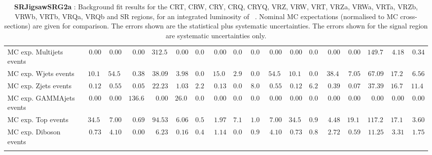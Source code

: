 \begin{table}
{\begin{tabular*}{\textwidth}{@{\extracolsep{\fill}}lrrrrrrrrrrrrrrrrr}
\noalign{\smallskip}\hline\noalign{\smallskip}
        MC exp. Multijets events         & $0.00$          & $0.00$          & $0.00$          & $312.57$          & $0.00$          & $0.00$          & $0.00$          & $0.00$          & $0.00$          & $0.00$          & $0.00$          & $0.00$          & $0.00$          & $0.00$          & $149.73$          & $4.18$          & $0.34$              \\
        MC exp. Wjets events         & $10.18$          & $54.56$          & $0.38$          & $38.09$          & $3.98$          & $0.00$          & $15.00$          & $2.95$          & $0.00$          & $54.56$          & $10.18$          & $0.00$          & $38.40$          & $7.05$          & $67.09$          & $17.29$          & $6.56$              \\
        MC exp. Zjets events         & $0.12$          & $0.55$          & $0.05$          & $22.23$          & $1.03$          & $2.29$          & $0.13$          & $0.02$          & $8.08$          & $0.55$          & $0.12$          & $6.29$          & $0.39$          & $0.07$          & $37.39$          & $16.73$          & $11.41$              \\
        MC exp. GAMMAjets events         & $0.00$          & $0.00$          & $136.64$          & $0.00$          & $26.08$          & $0.00$          & $0.00$          & $0.00$          & $0.00$          & $0.00$          & $0.00$          & $0.00$          & $0.00$          & $0.00$          & $0.00$          & $0.00$          & $0.00$              \\
        MC exp. Top events         & $34.51$          & $7.00$          & $0.69$          & $94.53$          & $6.06$          & $0.56$          & $1.97$          & $7.14$          & $1.09$          & $7.00$          & $34.51$          & $0.95$          & $4.48$          & $19.12$          & $117.28$          & $17.11$          & $3.60$              \\
        MC exp. Diboson events         & $0.73$          & $4.10$          & $0.00$          & $6.23$          & $0.16$          & $0.47$          & $1.14$          & $0.06$          & $0.93$          & $4.10$          & $0.73$          & $0.81$          & $2.72$          & $0.59$          & $11.25$          & $3.31$          & $1.75$              \\
\noalign{\smallskip}\hline\noalign{\smallskip}
\end{tabular*}
}
\caption{{\bf SRJigsawSRG2a} : Background fit results for the CRT, CRW, CRY, CRQ, CRYQ, VRZ, VRW, VRT, VRZa, VRWa, VRTa, VRZb, VRWb, VRTb, VRQa, VRQb and SR regions, for an integrated luminosity of \ourintlumi~\ifb. Nominal MC expectations (normalised to MC cross-sections) are given for comparison. The errors shown are the statistical plus systematic uncertainties. The errors shown for the signal region are systematic uncertainties only.}
\label{table.results.systematics.in.logL.fit.CRT.CRW.CRY.CRQ.CRYQ.VRZ.VRW.VRT.VRZa.VRWa.VRTa.VRZb.VRWb.VRTb.VRQa.VRQb.SR.SRJigsawSRG2a}
\end{table}
%